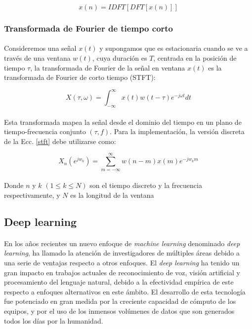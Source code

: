 \documentclass[12pt]{article}%
\begin{document}
\begin{equation}
\label{condition}
x(n) = IDFT[DFT[x(n)]]
\end{equation}

\subsubsection{Transformada de Fourier de tiempo corto}
\paragraph{}
Consideremos una señal $x(t)$ y supongamos que es estacionaria cuando se ve a través de una ventana $w(t)$, cuya duración es $T$, centrada en la posición de tiempo $\tau$, la transformada de Fourier de la señal en ventana $x(t)$ es la transformada de Fourier de corto tiempo \cite{yufeng} (STFT):

\begin{equation}
\label{stft}
X(\tau,\omega)=\int_{-\infty}^{\infty}x(t)w(t-\tau)e^{-j\omega{t}}dt
\end{equation}

\paragraph{}
Esta transformada mapea la señal desde el dominio del tiempo en un plano de tiempo-frecuencia conjunto $(\tau,f)$. Para la implementación, la versión discreta de la Ecc. \ref{stft} debe utilizarse como:

\begin{equation}
X_{n}(e^{jw_{k}})=\sum_{m=-\infty}^{\infty}w(n-m)x(m)e^{-jw_{k}m}
\end{equation}

\paragraph{}
Donde $n$ y $k$ $(1{\leq}k{\leq}N)$ son el tiempo discreto y la frecuencia respectivamente, y $N$ es la longitud de la ventana

\subsection{Deep learning}
\paragraph{}

En los años recientes un nuevo enfoque de \textit{machine learning} denominado \textit{deep learning}, ha llamado la atención de investigadores de múltiples áreas debido a una serie de ventajas respecto a otros enfoques. El \textit{deep learning} ha tenido un gran impacto en trabajos actuales de reconocimiento de voz, visión artificial y procesamiento del lenguaje natural, debido a la efectividad empírica de este respecto a enfoques alternativos en este ámbito. El desarrollo de esta tecnología fue potenciado en gran medida por la creciente capacidad de cómputo de los equipos, y por el uso de los inmensos volúmenes de datos que son generados todos los días por la humanidad.
\end{document}
